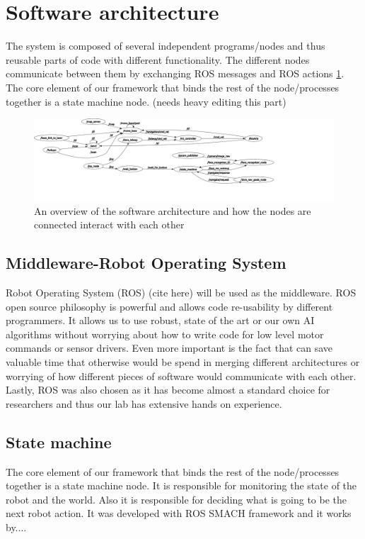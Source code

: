 \documentclass[conference]{IEEEtran}
\begin{document}
\section{Software architecture}
The system is composed of several independent programs/nodes and thus reusable parts of code with different functionality. The different nodes communicate between them by exchanging ROS messages and ROS actions \ref{fig:nodes}. The core element of our framework that binds the rest of the node/processes together is a state machine node. (needs heavy editing this part)

\begin{figure}[!t]
\centering
\includegraphics[width=4.in]{nodes.png}
\caption{An overview of the software architecture and how the nodes are connected interact with each other}
\label{fig:nodes}
\end{figure}

\subsection{Middleware-Robot Operating System}
Robot Operating System (ROS) (cite here) will be used as the middleware. ROS open source philosophy is powerful and allows code re-usability by different programmers. It allows us to use robust, state of the art or our own AI algorithms without worrying about how to write code for low level motor commands or sensor drivers. Even more important is the fact that can save valuable time that otherwise would be spend in merging different architectures or worrying of how different pieces of software would communicate with each other. Lastly, ROS was also chosen as it has become almost a standard choice for researchers and thus our lab has extensive hands on experience.

\subsection{State machine}
The core element of our framework that binds the rest of the node/processes together is a state machine node. It is responsible for monitoring the state of the robot and the world. Also it is responsible for deciding what is going to be the next robot action. It was developed with ROS SMACH framework and it works by....
\end{document}
